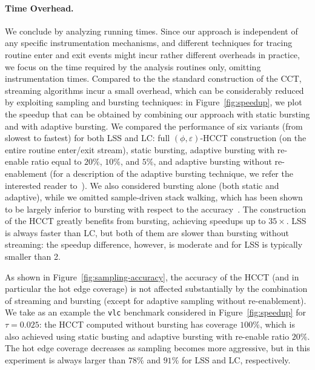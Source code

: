 \documentclass{sigplanconf}
\begin{document}
\paragraph{Time Overhead.} We conclude by analyzing running times. Since our approach is independent of any specific instrumentation mechanisms, and different techniques for tracing routine enter and exit events might incur rather different overheads in practice, we focus on the time required by the analysis routines only, omitting instrumentation times. Compared to the the standard construction of the CCT, streaming algorithms incur a small overhead, which can be considerably reduced by exploiting sampling and bursting techniques: in Figure~\ref{fig:speedup}, we plot the speedup that can be obtained by combining our approach with static bursting and with adaptive bursting. We compared the performance of six variants (from slowest to fastest) for both LSS and LC: full $(\phi,\varepsilon)$-HCCT construction (on the entire routine enter/exit stream), static bursting, adaptive bursting with re-enable ratio equal to $20\%$,  $10\%$,  and $5\%$, and adaptive bursting without re-enablement (for a description of the adaptive bursting technique, we refer the interested reader to~\cite{ZSCC06}). We also considered bursting alone (both static and adaptive), while we omitted sample-driven stack walking, which has been shown to be largely inferior to bursting with respect to the accuracy~\cite{ZSCC06}. The construction of the HCCT greatly benefits from bursting, achieving speedups up to $35\times$. LSS is always faster than LC, but both of them are slower than bursting without streaming: the speedup difference, however, is moderate and for LSS is typically smaller than 2.

As shown in Figure~\ref{fig:sampling-accuracy}, the accuracy of the HCCT (and in particular the hot edge coverage) is not affected substantially by the combination of streaming and bursting (except for adaptive sampling without re-enablement). We take as an example the {\tt vlc} benchmark considered in Figure~\ref{fig:speedup} for $\tau=0.025$: the HCCT computed without bursting has coverage $100\%$, which is also achieved using static busting and adaptive bursting with re-enable ratio $20\%$. The hot edge coverage decreases as sampling becomes more aggressive, but in this experiment is always larger than $78\%$ and $91\%$ for LSS and LC, respectively.
\end{document}
